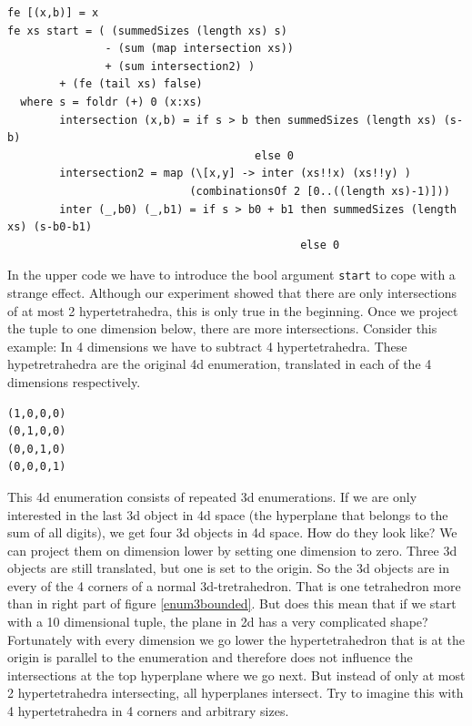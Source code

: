 \documentclass{tmr}
\begin{document}
\begin{Verbatim}
fe [(x,b)] = x
fe xs start = ( (summedSizes (length xs) s)
               - (sum (map intersection xs))
               + (sum intersection2) )
        + (fe (tail xs) false)
  where s = foldr (+) 0 (x:xs)
        intersection (x,b) = if s > b then summedSizes (length xs) (s-b)
                                      else 0
        intersection2 = map (\[x,y] -> inter (xs!!x) (xs!!y) )
                            (combinationsOf 2 [0..((length xs)-1)]))
        inter (_,b0) (_,b1) = if s > b0 + b1 then summedSizes (length xs) (s-b0-b1)
                                             else 0
\end{Verbatim}

In the upper code we have to introduce the bool argument \verb|start| to cope with a strange effect. Although our experiment showed that there are only intersections of at most 2 hypertetrahedra, this is only true in the beginning. Once we project the tuple to one dimension below, there are more intersections.
Consider this example: In 4 dimensions we have to subtract 4 hypertetrahedra. These hypetretrahedra are the original 4d enumeration, translated in each of the 4 dimensions respectively. \eg
\begin{Verbatim}
(1,0,0,0)
(0,1,0,0)
(0,0,1,0)
(0,0,0,1)
\end{Verbatim}

This 4d enumeration consists of repeated 3d enumerations. If we are only interested in the last 3d object in 4d space (the hyperplane that belongs to the sum of all digits), we get four 3d objects in 4d space. How do they look like? We can project them on dimension lower by setting one dimension to zero. Three 3d objects are still translated, but one is set to the origin. So the 3d objects are in every of the 4 corners of a normal 3d-tretrahedron. That is one tetrahedron more than in right part of figure \ref{enum3bounded}. But does this mean that if we start with a 10 dimensional tuple, the plane in 2d has a very complicated shape? Fortunately with every dimension we go lower the hypertetrahedron that is at the origin is parallel to the enumeration and therefore does not influence the intersections at the top hyperplane where we go next. But instead of only at most 2 hypertetrahedra intersecting, all hyperplanes intersect. Try to imagine this with 4 hypertetrahedra in 4 corners and arbitrary sizes.

\end{document}

